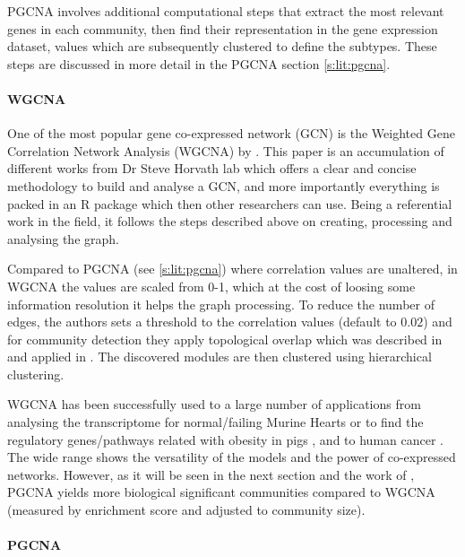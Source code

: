 PGCNA involves additional computational steps that extract the most relevant genes in each community, then find their representation in the gene expression dataset, values which are subsequently clustered to define the subtypes. These steps are discussed in more detail in the PGCNA section \cref{s:lit:pgcna}.


\paragraph*{WGCNA} \label{s:lit:WGCNA}

One of the most popular gene co-expressed network (GCN) is the Weighted Gene Correlation Network Analysis (WGCNA) by \citet{Langfelder2008-sn}. This paper is an accumulation of different works from Dr Steve Horvath lab which offers a clear and concise methodology to build and analyse a GCN, and more importantly everything is packed in an R package which then other researchers can use. Being a referential work in the field, it follows the steps described above on creating, processing and analysing the graph.

Compared to PGCNA (see \ref{s:lit:pgcna}) where correlation values are unaltered, in WGCNA the values are scaled from 0-1, which at the cost of loosing some information resolution it helps the graph processing. To reduce the number of edges, the authors sets a threshold to the correlation values (default to $0.02$) and for community detection they apply topological overlap which was described in \citet{Zhang2005-xq} and applied in \cite{Yip2007-mr, Li2007-vz, Ravasz2002-au}. The discovered modules are then clustered using hierarchical clustering.

WGCNA has been successfully used to a large number of applications from analysing the transcriptome for normal/failing Murine Hearts \citet{Lee2011-wm} or to find the regulatory genes/pathways related with obesity in pigs \citet{Kogelman2014-ea}, and to human cancer \cite{Yang2014-wv, Clarke2013-wd, Care2019-ij}. The wide range shows the versatility of the models and the power of co-expressed networks. However, as it will be seen in the next section and the work of \citet{Care2019-ij}, PGCNA yields more biological significant communities compared to WGCNA (measured by enrichment score and adjusted to community size).

\paragraph*{PGCNA} \label{s:lit:pgcna}


